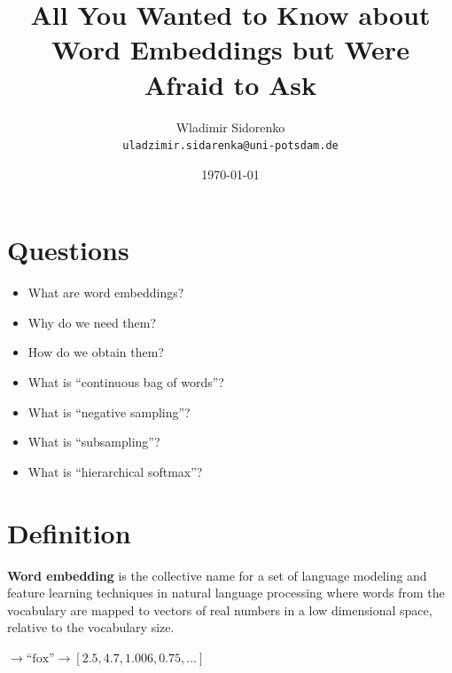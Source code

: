 \documentclass{beamer}
\title[Word Embeddings]{All You Wanted to Know about Word Embeddings but Were Afraid to Ask}
\author[Sidorenko]{Wladimir Sidorenko\\ \texttt{uladzimir.sidarenka{@}uni-potsdam.de}}
\institute[Uni Potsdam]{University of Potsdam}
\date{\today}
\begin{document}
    \begin{frame}{}
      \titlepage
    \end{frame}


    \section{Questions}
    \begin{frame}{\insertsection}
      \begin{itemize}
        \item What are word embeddings?
        \item Why do we need them?
        \item How do we obtain them?
        \item What is ``continuous bag of words''?
        \item What is ``negative sampling''?
        \item What is ``subsampling''?
        \item What is ``hierarchical softmax''?
      \end{itemize}
    \end{frame}

    \section{Definition}
    \begin{frame}{\insertsubsection}
      \begin{definition}
        \textbf{Word embedding} is the collective name for a set of
        language modeling and feature learning techniques in natural
        language processing where words from the vocabulary are mapped
        to vectors of real numbers in a low dimensional space,
        relative to the vocabulary size.
      \end{definition}
      \begin{center}
        \large{} $\rightarrow \textrm{``fox''} \rightarrow [2.5, 4.7, 1.006, 0.75, ...]$
      \end{center}
    \end{frame}
\end{document}
